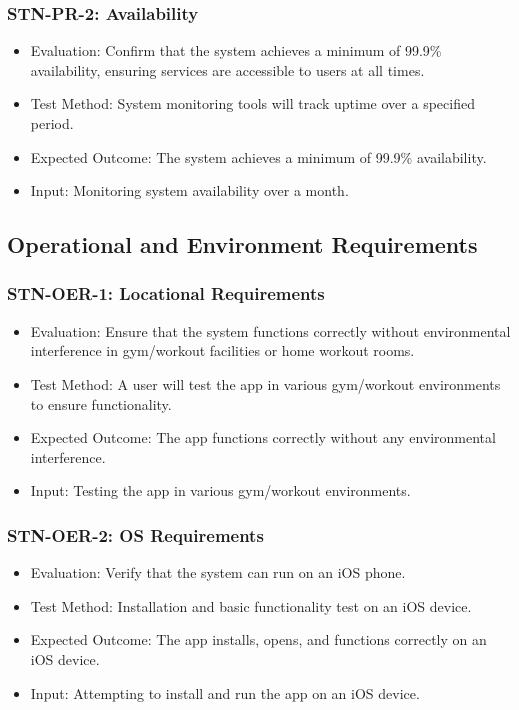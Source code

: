 \documentclass[12pt, titlepage]{article}
\begin{document}
\subsubsection{STN-PR-2: Availability}
\begin{itemize}
    \item Evaluation: Confirm that the system achieves a minimum of 99.9\% availability, ensuring services are accessible to users at all times.
    \item Test Method: System monitoring tools will track uptime over a specified period.
    \item Expected Outcome: The system achieves a minimum of 99.9\% availability.
    \item Input: Monitoring system availability over a month.
\end{itemize}

\subsection{Operational and Environment Requirements}

\subsubsection{STN-OER-1: Locational Requirements}
\begin{itemize}
    \item Evaluation: Ensure that the system functions correctly without environmental interference in gym/workout facilities or home workout rooms.
    \item Test Method: A user will test the app in various gym/workout environments to ensure functionality.
    \item Expected Outcome: The app functions correctly without any environmental interference.
    \item Input: Testing the app in various gym/workout environments.
\end{itemize}

\subsubsection{STN-OER-2: OS Requirements}
\begin{itemize}
    \item Evaluation: Verify that the system can run on an iOS phone.
    \item Test Method: Installation and basic functionality test on an iOS device.
    \item Expected Outcome: The app installs, opens, and functions correctly on an iOS device.
    \item Input: Attempting to install and run the app on an iOS device.
\end{itemize}
\end{document}
